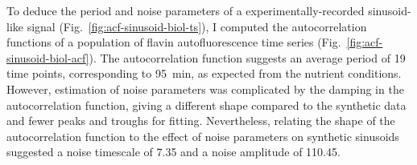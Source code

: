 To deduce the period and noise parameters of a experimentally-recorded sinusoid-like signal (Fig.\ \ref{fig:acf-sinusoid-biol-ts}), I computed the autocorrelation functions of a population of flavin autofluorescence time series (Fig.\ \ref{fig:acf-sinusoid-biol-acf}).
The autocorrelation function suggests an average period of 19 time points, corresponding to \SI{95}{\minute}, as expected from the nutrient conditions.
However, estimation of noise parameters was complicated by the damping in the autocorrelation function, giving a different shape compared to the synthetic data and fewer peaks and troughs for fitting.
Nevertheless, relating the shape of the autocorrelation function to the effect of noise parameters on synthetic sinusoids suggested a noise timescale of 7.35 and a noise amplitude of 110.45.


